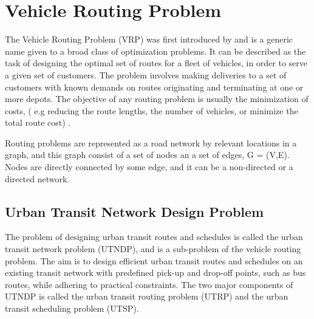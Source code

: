 \section{Vehicle Routing Problem }

The Vehicle Routing Problem (VRP) was first introduced by \citet{dantzig59} and is a generic name given to a broad class of optimization problems. It can be described as the task of designing the optimal set of routes for a fleet of vehicles, in order to serve a given set of customers. The problem involves making deliveries to a set of customers with known demands on routes originating and terminating at one or more depots. The objective of any routing problem is usually the minimization of costs, ( e.g reducing the route lengths, the number of vehicles, or minimize the total route cost) . 

Routing problems are represented as a road network by relevant locations in a graph, and this graph consist of a set of nodes an a set of edges, G = (V,E). Nodes are directly connected by some edge, and it can be a non-directed or a directed network. 

\subsection{Urban Transit Network Design Problem}

The problem of designing urban transit routes and schedules is called the urban transit network problem (UTNDP), and is a sub-problem of the vehicle routing problem. The aim is to design efficient urban transit routes and schedules on an existing transit network with predefined pick-up and drop-off points, such as bus routes, while adhering to practical constraints. The two major components of UTNDP is called the urban transit routing problem (UTRP) and the urban transit scheduling problem (UTSP).

